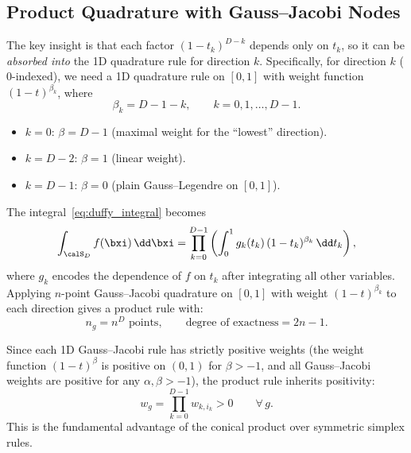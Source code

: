 \subsection{Product Quadrature with Gauss--Jacobi Nodes}

The key insight is that each factor $(1 - t_k)^{D-k}$ depends only on $t_k$,
so it can be \emph{absorbed into} the 1D quadrature rule for direction $k$.
Specifically, for direction $k$ ($0$-indexed), we need a 1D quadrature rule on
$[0,1]$ with weight function $(1-t)^{\beta_k}$, where
\begin{equation}
  \beta_k = D - 1 - k, \qquad k = 0, 1, \dots, D-1.
  \label{eq:beta_definition}
\end{equation}

\begin{itemize}[nosep]
  \item $k = 0$: $\beta = D-1$ (maximal weight for the ``lowest'' direction).
  \item $k = D-2$: $\beta = 1$ (linear weight).
  \item $k = D-1$: $\beta = 0$ (plain Gauss--Legendre on $[0,1]$).
\end{itemize}

The integral~\eqref{eq:duffy_integral} becomes
\begin{equation}
  \int_{\calS_D} f(\bxi)\,\dd\bxi
  = \prod_{k=0}^{D-1} \left(
    \int_0^1 g_k(t_k)\,(1 - t_k)^{\beta_k}\,\dd t_k
  \right),
  \label{eq:product_integral}
\end{equation}
where $g_k$ encodes the dependence of $f$ on $t_k$ after integrating all other
variables.  Applying $n$-point Gauss--Jacobi quadrature on $[0,1]$ with weight
$(1-t)^{\beta_k}$ to each direction gives a product rule with:
\begin{equation}
  \boxed{
  n_g = n^D \text{ points}, \qquad
  \text{degree of exactness} = 2n - 1.}
  \label{eq:conical_cost}
\end{equation}

\begin{proposition}
\label{prop:positive_weights}
Since each 1D Gauss--Jacobi rule has strictly positive weights (the weight
function $(1-t)^{\beta}$ is positive on $(0,1)$ for $\beta > -1$, and all
Gauss--Jacobi weights are positive for any $\alpha, \beta > -1$), the product
rule inherits positivity:
\begin{equation}
  w_g = \prod_{k=0}^{D-1} w_{k,i_k} > 0 \qquad \forall\, g.
  \label{eq:positive_product_weight}
\end{equation}
This is the fundamental advantage of the conical product over symmetric
simplex rules.
\end{proposition}


